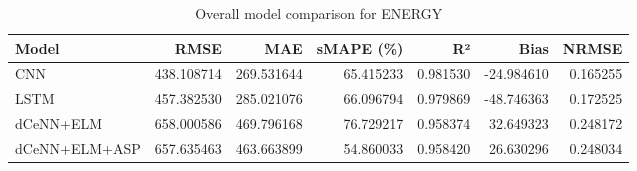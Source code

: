 \begin{table}
\caption{Overall model comparison for ENERGY}
\begin{tabular}{lrrrrrr}
\toprule
Model & RMSE & MAE & sMAPE (\%) & R² & Bias & NRMSE \\
\midrule
CNN & 438.108714 & 269.531644 & 65.415233 & 0.981530 & -24.984610 & 0.165255 \\
LSTM & 457.382530 & 285.021076 & 66.096794 & 0.979869 & -48.746363 & 0.172525 \\
dCeNN+ELM & 658.000586 & 469.796168 & 76.729217 & 0.958374 & 32.649323 & 0.248172 \\
dCeNN+ELM+ASP & 657.635463 & 463.663899 & 54.860033 & 0.958420 & 26.630296 & 0.248034 \\
\bottomrule
\end{tabular}
\end{table}
